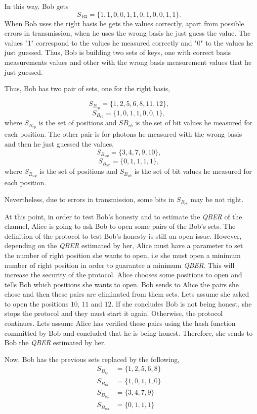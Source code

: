 \begin{enumerate}
      In this way, Bob gets $$S_{B3} = \{1,1,0,0,1,1,0,1,0,0,1,1 \}.$$ When Bob uses the right basis he gets the values correctly, apart from possible errors in transmission, when he uses the wrong basis he just guess the value. The values "1"\space{ } correspond to the values he measured correctly and "0" \space{ }to the values he just guessed.
      Thus, Bob is building two sets of keys, one with correct basis measurements values and other with the wrong basis measurement values that he just guessed.

      Thus, Bob has two pair of sets, one for the right basis,

      $$S_{B_{rp}}= \{1,2,5,6,8,11,12 \},$$ $$ S_{B_{rb}} = \{1,0,1,1,0,0,1 \},$$
      where $S_{B_{rp}}$ is the set of positions and $SB_{rb}$ is the set of bit values he measured for each position. The other pair is for photons he measured with the wrong basis and then he just guessed the values,
      $$S_{B_{wp}}= \{3,4,7,9,10 \},$$ $$S_{B_{wb}} = \{0,1,1,1,1 \},$$
      where $S_{B_{wp}}$ is the set of positions and $S_{B_{wb}}$ is the set of bit values he measured for each position.

      Nevertheless, due to errors in transmission, some bits in $S_{B_{rb}}$ may be not right.

      At this point, in order to test Bob's honesty and to estimate the \textit{QBER} of the channel, Alice is going to ask Bob to open some pairs of the Bob's sets. The definition of the protocol to test Bob's honesty is still an open issue. However, depending on the \textit{QBER} estimated by her, Alice must have a parameter to set the number of right position she wants to open, i.e she must open a minimum number of right position in order to guarantee a minimum \textit{QBER}. This will increase the security of the protocol. Alice chooses some positions to open and tells Bob which positions she wants to open. Bob sends to Alice the pairs she chose and then these pairs are eliminated from them sets. Lets assume she asked to open the positions $10$, $11$ and $12$. If she concludes Bob is not being honest, she stops the protocol and they must start it again. Otherwise, the protocol continues. Lets assume Alice has verified these pairs using the hash function committed by Bob and concluded that he is being honest. Therefore, she sends to Bob the \textit{QBER} estimated by her.

      Now, Bob has the previous sets replaced by the following,
      \begin{align*}
        S_{B_{rp}} & = \{1,2,5,6,8 \} \\
        S_{B_{rb}} & = \{1,0,1,1,0 \} \\
        S_{B_{wp}} & = \{3,4,7,9 \} \\
        S_{B_{wb}} & = \{0,1,1,1 \}
      \end{align*}



\end{enumerate}
